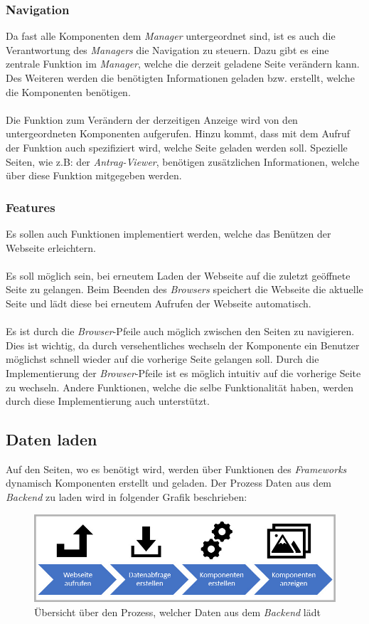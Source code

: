\subsubsection{Navigation}
Da fast alle Komponenten dem \textit{Manager} untergeordnet sind, ist es auch die Verantwortung des \textit{Managers} die Navigation zu steuern. Dazu gibt es eine zentrale Funktion im \textit{Manager}, welche die derzeit geladene Seite verändern kann. Des Weiteren werden die benötigten Informationen geladen bzw. erstellt, welche die Komponenten benötigen.
\\\\
Die Funktion zum Verändern der derzeitigen Anzeige wird von den untergeordneten Komponenten aufgerufen. Hinzu kommt, dass mit dem Aufruf der Funktion auch spezifiziert wird, welche Seite geladen werden soll. Spezielle Seiten, wie z.B: der \textit{Antrag-Viewer}, benötigen zusätzlichen Informationen, welche über diese Funktion mitgegeben werden.

\subsubsection{Features}
\label{sec:feature}
Es sollen auch Funktionen implementiert werden, welche das Benützen der Webseite erleichtern.
\\\\
Es soll möglich sein, bei erneutem Laden der Webseite auf die zuletzt geöffnete Seite zu gelangen. Beim Beenden des \textit{Browsers} speichert die Webseite die aktuelle Seite und lädt diese bei erneutem Aufrufen der Webseite automatisch.
\\\\
Es ist durch die \textit{Browser}-Pfeile auch möglich zwischen den Seiten zu navigieren. Dies ist wichtig, da durch versehentliches wechseln der Komponente ein Benutzer möglichst schnell wieder auf die vorherige Seite gelangen soll. Durch die Implementierung der \textit{Browser}-Pfeile ist es möglich intuitiv auf die vorherige Seite zu wechseln. Andere Funktionen, welche die selbe Funktionalität haben, werden durch diese Implementierung auch unterstützt.
\newpage
\subsection{Daten laden}
Auf den Seiten, wo es benötigt wird, werden über Funktionen des \textit{Frameworks} dynamisch Komponenten erstellt und geladen. Der Prozess Daten aus dem \textit{Backend} zu laden wird in folgender Grafik beschrieben:
\begin{figure}[H]
	\centering
	\includegraphics[width=0.8\linewidth]{images/rfoster_konzept/Prozess_Daten_laden}
	\caption[Prozess der Daten zur Anzeige]{Übersicht über den Prozess, welcher Daten aus dem \textit{Backend} lädt}
	\label{fig:prozessdatenladen}
\end{figure}

